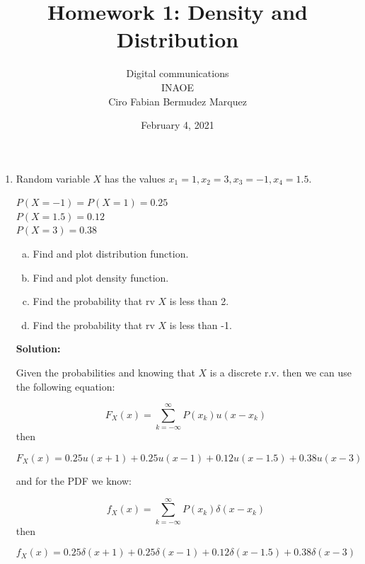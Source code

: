 \documentclass[10pt,a4paper]{article}
\author{Digital communications \\INAOE\\Ciro Fabian Bermudez Marquez}
\title{Homework 1: Density and Distribution}
\date{February 4, 2021}
\begin{document}
\maketitle

\begin{enumerate}
	\item Random variable $X$ has the values $x_{1}=1, x_{2}=3, x_{3}=-1, x_{4}=1.5$. 
	
	$P(X=-1)=P(X=1) = 0.25$\\
	$P(X=1.5)= 0.12$\\
	$P(X=3) = 0.38$	
	\begin{enumerate}[a.]
		\item Find and plot distribution function.
		\item Find and plot density function.
		\item Find the probability that rv $X$ is less than 2.
		\item Find the probability that rv $X$ is less than -1.
	\end{enumerate}
	
	\textbf{Solution:}
	
	Given the probabilities and knowing that $X$ is a discrete r.v. then we can use the following equation:
	
	\begin{equation}
		F_{X}(x) = \sum_{k= - \infty}^{\infty} P(x_{k}) u(x - x_{k})
	\end{equation}
	then
	
	\begin{tcolorbox}
		\begin{equation}
			F_{X}(x) =  0.25 u(x + 1) + 0.25 u(x - 1) + 0.12 u(x - 1.5) + 0.38 u(x - 3)
		\end{equation}
	\end{tcolorbox}
	
	and for the PDF we know:
	
	\begin{equation}
		f_{X}(x) = \sum_{k= - \infty}^{\infty} P(x_{k}) \delta(x - x_{k})
	\end{equation}
	then
	
	\begin{tcolorbox}
		\begin{equation}
			f_{X}(x) =  0.25 \delta(x + 1) + 0.25 \delta(x - 1) + 0.12 \delta(x - 1.5) + 0.38 \delta(x - 3)
	\end{equation}
	\end{tcolorbox}
	

\end{enumerate}
\end{document}
